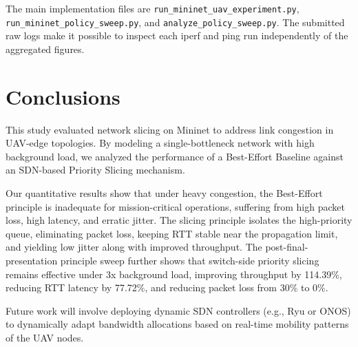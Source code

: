 \documentclass[conference]{IEEEtran}
\begin{document}
The main implementation files are \texttt{run\_mininet\_uav\_experiment.py}, \texttt{run\_mininet\_policy\_sweep.py}, and \texttt{analyze\_policy\_sweep.py}. The submitted raw logs make it possible to inspect each iperf and ping run independently of the aggregated figures.

\section{Conclusions}
This study evaluated network slicing on Mininet to address link congestion in UAV-edge topologies. By modeling a single-bottleneck network with high background load, we analyzed the performance of a Best-Effort Baseline against an SDN-based Priority Slicing mechanism. 

Our quantitative results show that under heavy congestion, the Best-Effort principle is inadequate for mission-critical operations, suffering from high packet loss, high latency, and erratic jitter. The slicing principle isolates the high-priority queue, eliminating packet loss, keeping RTT stable near the propagation limit, and yielding low jitter along with improved throughput. The post-final-presentation principle sweep further shows that switch-side priority slicing remains effective under 3x background load, improving throughput by 114.39\%, reducing RTT latency by 77.72\%, and reducing packet loss from 30\% to 0\%.

Future work will involve deploying dynamic SDN controllers (e.g., Ryu or ONOS) to dynamically adapt bandwidth allocations based on real-time mobility patterns of the UAV nodes.
\end{document}
